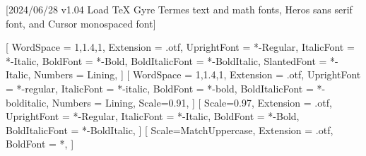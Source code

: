 
[2024/06/28 v1.04 Load TeX Gyre Termes text and math fonts, Heros sans serif font, and Cursor monospaced font]

%
%
\ifpdftex
	\RequirePackage[T1]{fontenc}	
	\RequirePackage{bm}
\else
    \RequirePackage[warnings-off={mathtools-colon,mathtools-overbracket}]{unicode-math}
    \setmainfont{TeXGyreTermesX}[%
		WordSpace = {1,1.4,1},
    	Extension = .otf,
    	UprightFont = *-Regular,
    	ItalicFont = *-Italic,
    	BoldFont = *-Bold,
    	BoldItalicFont = *-BoldItalic,
		SlantedFont = *-Italic,
		Numbers = Lining,
	]
    \setsansfont{texgyreheros}[%
		WordSpace = {1,1.4,1},
		Extension = .otf,
    	UprightFont = *-regular,
    	ItalicFont = *-italic,
    	BoldFont = *-bold,
    	BoldItalicFont = *-bolditalic,
		Numbers = Lining,
    	Scale=0.91,%
	]        
   \setmonofont{texgyrecursor}[%
        Scale=0.97,
        Extension = .otf,
        UprightFont = *-Regular,
        ItalicFont = *-Italic,
        BoldFont = *-Bold, 
    	BoldItalicFont = *-BoldItalic,
    ]             
    [%
    	Scale=MatchUppercase,
    	Extension = .otf,
		BoldFont = *, %
    ]
    \newcommand*{\FRAC}[1]{{\addfontfeature{Fractions=On}#1}}%
\fi
